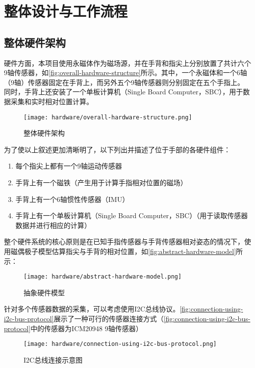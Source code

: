 \cleardoublepage

\section{整体设计与工作流程}
\subsection{整体硬件架构}

硬件方面，本项目使用永磁体作为磁场源，并在手背和指尖上分别放置了共计六个9轴传感器，如\autoref{fig:overall-hardware-structure}所示。其中，一个永磁体和一个6轴（9轴）传感器固定在手背上，而另外五个9轴传感器则分别固定在五个手指上。
同时，手背上还安装了一个单板计算机（Single Board Computer，SBC），用于数据采集和实时相对位置计算。
\begin{figure}[H]
    \centering
    \texttt{[image: hardware/overall-hardware-structure.png]}
    \caption{\label{fig:overall-hardware-structure}整体硬件架构}
\end{figure}

为了使以上叙述更加清晰明了，以下列出并描述了位于手部的各硬件组件：
\begin{enumerate}[label=(\alph*)]
\item 每个指尖上都有一个9轴运动传感器
\item 手背上有一个磁铁（产生用于计算手指相对位置的磁场）
\item 手背上有一个6轴惯性传感器（IMU）
\item 手背上有一个单板计算机（Single Board Computer，SBC）（用于读取传感器数据并进行相应的计算）
\end{enumerate}

整个硬件系统的核心原则是在已知手指传感器与手背传感器相对姿态的情况下，使用磁偶极子模型估算指尖与手背的相对位置，如\autoref{fig:abstract-hardware-model}所示：

\begin{figure}[H]
    \centering
    \texttt{[image: hardware/abstract-hardware-model.png]}
    \caption{\label{fig:abstract-hardware-model}抽象硬件模型}
\end{figure}

针对多个传感器数据的采集，可以考虑使用I2C总线协议。\autoref{fig:connection-using-i2c-bus-protocol}展示了一种可行的传感器连接方式（\autoref{fig:connection-using-i2c-bus-protocol}中的传感器为ICM20948 9轴传感器）

\begin{figure}[H]
    \centering
    \texttt{[image: hardware/connection-using-i2c-bus-protocol.png]}
    \caption{\label{fig:connection-using-i2c-bus-protocol}I2C总线连接示意图}
\end{figure}

